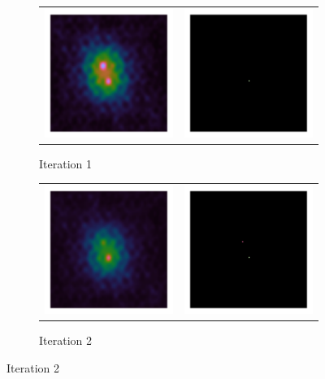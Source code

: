 \begin{figure}[h]
\begin{subfigure}[b]{0.45\linewidth}
\begin{tabular}{c c}
			\includegraphics[width=0.45\linewidth, clip, trim= 1.0in 1.0in 1.0in 1.0in]{./chapters/01.intro/cleanExample/dirty_CLEAN_1.png} & \includegraphics[width=0.45\linewidth, clip, trim= 1.0in 1.0in 1.0in 1.0in]{./chapters/01.intro/cleanExample/model_CLEAN_1.png} 
		\end{tabular}
		\caption{Iteration 1}
	\end{subfigure}
	\begin{subfigure}[b]{0.45\linewidth}
		\begin{tabular}{c c}
			\includegraphics[width=0.45\linewidth, clip, trim= 1.0in 1.0in 1.0in 1.0in]{./chapters/01.intro/cleanExample/dirty_CLEAN_2.png} & \includegraphics[width=0.45\linewidth, clip, trim= 1.0in 1.0in 1.0in 1.0in]{./chapters/01.intro/cleanExample/model_CLEAN_2.png} 
		\end{tabular}
		\caption{Iteration 2}


\end{subfigure}
\end{figure}
